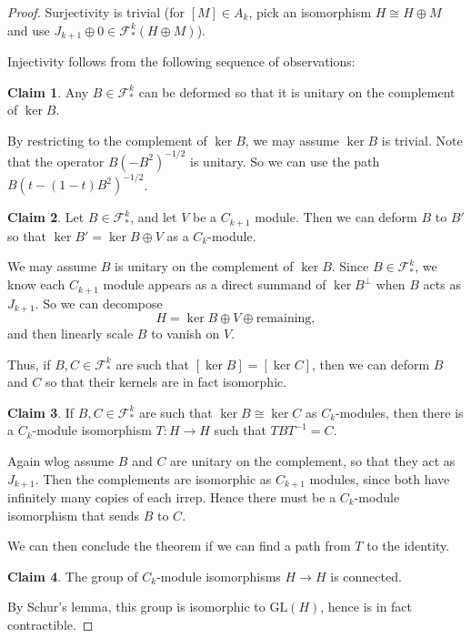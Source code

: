 \documentclass{shortart}
\theoremstyle{definition}
\newtheorem*{claim}{Claim}
\newcommand\GL{\mathrm{GL}}
\begin{document}
\begin{proof}
  \separator

  Surjectivity is trivial (for $[M] \in A_k$, pick an isomorphism $H \cong H \oplus M$ and use $J_{k + 1} \oplus 0 \in \mathcal{F}^k_* (H \oplus M)$).

  \separator

  Injectivity follows from the following sequence of observations:
  \begin{claim}
    Any $B \in \mathcal{F}_*^k$ can be deformed so that it is unitary on the complement of $\ker B$.
  \end{claim}
  By restricting to the complement of $\ker B$, we may assume $\ker B$ is trivial. Note that the operator $B(-B^2)^{-1/2}$ is unitary. So we can use the path $B(t - (1 - t)B^2)^{-1/2}$.

  \begin{claim}
    Let $B \in \mathcal{F}_*^k$, and let $V$ be a $C_{k + 1}$ module. Then we can deform $B$ to $B'$ so that $\ker B' = \ker B \oplus V$ as a $C_k$-module.
  \end{claim}
  We may assume $B$ is unitary on the complement of $\ker B$. Since $B \in \mathcal{F}_*^k$, we know each $C_{k + 1}$ module appears as a direct summand of $\ker B^\perp$ when $B$ acts as $J_{k + 1}$. So we can decompose
  \[
    H = \ker B \oplus V \oplus \text{remaining},
  \]
  and then linearly scale $B$ to vanish on $V$.

  Thus, if $B, C \in \mathcal{F}^k_*$ are such that $[\ker B] = [\ker C]$, then we can deform $B$ and $C$ so that their kernels are in fact isomorphic.
  \begin{claim}
    If $B, C \in \mathcal{F}^k_*$ are such that $\ker B \cong \ker C$ as $C_k$-modules, then there is a $C_k$-module isomorphism $T: H \to H$ such that $TBT^{-1} = C$.
  \end{claim}
  Again wlog assume $B$ and $C$ are unitary on the complement, so that they act as $J_{k + 1}$. Then the complements are isomorphic as $C_{k + 1}$ modules, since both have infinitely many copies of each irrep. Hence there must be a $C_k$-module isomorphism that sends $B$ to $C$.

  We can then conclude the theorem if we can find a path from $T$ to the identity.
  \begin{claim}
    The group of $C_k$-module isomorphisms $H \to H$ is connected.
  \end{claim}
  By Schur's lemma, this group is isomorphic to $\GL(H)$, hence is in fact contractible.
\end{proof}
\end{document}
